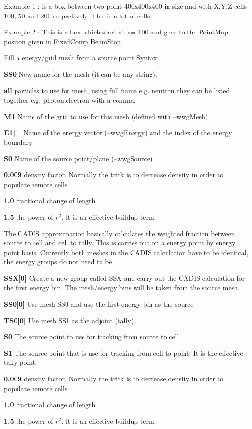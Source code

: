 \begin{description}
  \begin{description}
  \item Example 1 : is a box between two point 400x400x400 in size and with
    X,Y,Z cells 100, 50 and 200 respectively. This is a lot of cells!
  \item Example 2 : This is a box which start at x=-100 and goes to the
    PointMap positon given in FixedComp BeamStop
  
\item[--wwgCreate] Fill a energy/grid mesh  from a source point
  Syntax:
\begin{description}
  \item {\bf SS0} New name for the mesh (it can be any string).
  \item {\bf all} particles to use for mesh, using full name e.g. neutron
    they can be listed together e.g. photon,electron with a comma.
  \item {\bf M1} Name of the grid to use for this mesh (defined with --wwgMesh)
  \item {\bf E1[1]} Name of the energy vector (--wwgEnergy)
    and the index of the energy boundary
  \item {\bf S0} Name of the source point/plane (--wwgSource)
  \item {\bf 0.009} density factor. Normally the trick is to decrease density in order to populate remote cells.
  \item {\bf 1.0} fractional change of length
  \item {\bf 1.5} the power of $r^2$. It is an effective buildup term.
\end{description}

\item[--wwgCADIS] The CADIS approximation basically calculates the weighted
  fraction between source to cell and cell to tally. This is carries out on
  a energy point by energy point basis. Currently both meshes in the CADIS
  calculation have to be identical, the energy groups do not need to be.

\begin{description}
  \item {\bf SSX[0]} Create a new group called SSX and carry out the
    CADIS calculation for the first energy bin. The mesh/energy bins
    will be taken from the source mesh.    
  \item {\bf SS0[0]} Use mesh SS0 and use the first energy bin as the source
  \item {\bf TS0[0]} Use mesh SS1 as the adjoint (tally).
  \item {\bf S0} The source point to use for tracking from source to cell.
  \item {\bf S1} The source point that is use for tracking from cell to point. It is the effective
    tally point.
  \item {\bf 0.009} density factor. Normally the trick is to decrease density in order to populate remote cells.
  \item {\bf 1.0} fractional change of length
  \item {\bf 1.5} the power of $r^2$. It is an effective buildup term.
\end{description}



\end{description}
\end{description}
